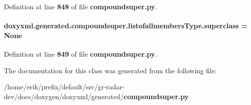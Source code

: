 Definition at line {\bf 848} of file {\bf compoundsuper.\+py}.

\paragraph[{superclass}]{\setlength{\rightskip}{0pt plus 5cm}doxyxml.\+generated.\+compoundsuper.\+listofallmembers\+Type.\+superclass = None\hspace{0.3cm}{\ttfamily [static]}}\label{classdoxyxml_1_1generated_1_1compoundsuper_1_1listofallmembersType_a81fe126c6c7718a591608ceeb5a34da2}


Definition at line {\bf 849} of file {\bf compoundsuper.\+py}.



The documentation for this class was generated from the following file\+:\begin{DoxyCompactItemize}
\item 
/home/erik/prefix/default/src/gr-\/radar-\/dev/docs/doxygen/doxyxml/generated/{\bf compoundsuper.\+py}\end{DoxyCompactItemize}

